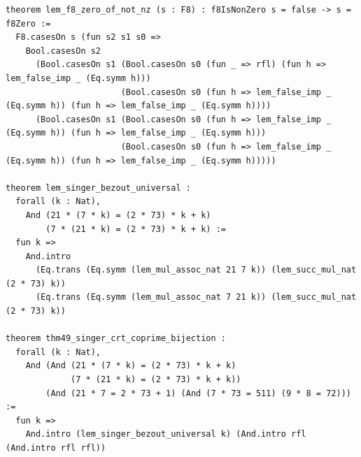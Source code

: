 \documentclass[11pt,letterpaper]{article}
\theoremstyle{spectralthm}
\begin{document}
\begin{lstlisting}[language=Lean4,caption={Standalone Pure Init.Prelude Term-Mode Lean 4 Kernel Suite (thm30--thm61, v0.0.0, 0 sorry, 0 axioms).},label={lst:lean_unified}]
theorem lem_f8_zero_of_not_nz (s : F8) : f8IsNonZero s = false -> s = f8Zero :=
  F8.casesOn s (fun s2 s1 s0 =>
    Bool.casesOn s2
      (Bool.casesOn s1 (Bool.casesOn s0 (fun _ => rfl) (fun h => lem_false_imp _ (Eq.symm h)))
                       (Bool.casesOn s0 (fun h => lem_false_imp _ (Eq.symm h)) (fun h => lem_false_imp _ (Eq.symm h))))
      (Bool.casesOn s1 (Bool.casesOn s0 (fun h => lem_false_imp _ (Eq.symm h)) (fun h => lem_false_imp _ (Eq.symm h)))
                       (Bool.casesOn s0 (fun h => lem_false_imp _ (Eq.symm h)) (fun h => lem_false_imp _ (Eq.symm h)))))

theorem lem_singer_bezout_universal :
  forall (k : Nat),
    And (21 * (7 * k) = (2 * 73) * k + k)
        (7 * (21 * k) = (2 * 73) * k + k) :=
  fun k =>
    And.intro
      (Eq.trans (Eq.symm (lem_mul_assoc_nat 21 7 k)) (lem_succ_mul_nat (2 * 73) k))
      (Eq.trans (Eq.symm (lem_mul_assoc_nat 7 21 k)) (lem_succ_mul_nat (2 * 73) k))

theorem thm49_singer_crt_coprime_bijection :
  forall (k : Nat),
    And (And (21 * (7 * k) = (2 * 73) * k + k)
             (7 * (21 * k) = (2 * 73) * k + k))
        (And (21 * 7 = 2 * 73 + 1) (And (7 * 73 = 511) (9 * 8 = 72))) :=
  fun k =>
    And.intro (lem_singer_bezout_universal k) (And.intro rfl (And.intro rfl rfl))


\end{lstlisting}
\end{document}
